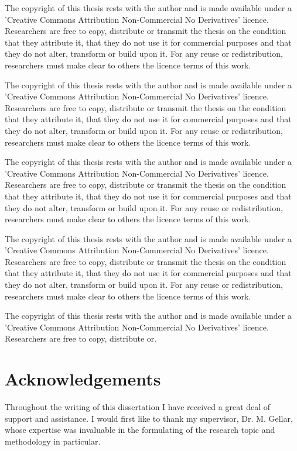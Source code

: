 \documentclass[a4paper,12pt]{report}
\begin{document}
The copyright of this thesis rests with the author and is made available under a 'Creative Commons Attribution Non-Commercial No Derivatives' licence. Researchers are free to copy, distribute or transmit the thesis on the condition that they attribute it, that they do not use it for commercial purposes and that they do not alter, transform or build upon it. For any reuse or redistribution, researchers must make clear to others the licence terms of this work.

The copyright of this thesis rests with the author and is made available under a 'Creative Commons Attribution Non-Commercial No Derivatives' licence. Researchers are free to copy, distribute or transmit the thesis on the condition that they attribute it, that they do not use it for commercial purposes and that they do not alter, transform or build upon it. For any reuse or redistribution, researchers must make clear to others the licence terms of this work.

The copyright of this thesis rests with the author and is made available under a 'Creative Commons Attribution Non-Commercial No Derivatives' licence. Researchers are free to copy, distribute or transmit the thesis on the condition that they attribute it, that they do not use it for commercial purposes and that they do not alter, transform or build upon it. For any reuse or redistribution, researchers must make clear to others the licence terms of this work.

The copyright of this thesis rests with the author and is made available under a 'Creative Commons Attribution Non-Commercial No Derivatives' licence. Researchers are free to copy, distribute or transmit the thesis on the condition that they attribute it, that they do not use it for commercial purposes and that they do not alter, transform or build upon it. For any reuse or redistribution, researchers must make clear to others the licence terms of this work.

The copyright of this thesis rests with the author and is made available under a 'Creative Commons Attribution Non-Commercial No Derivatives' licence. Researchers are free to copy, distribute or.


\chapter*{Acknowledgements}
Throughout the writing of this dissertation I have received a great deal of support and assistance. I  would  first  like  to  thank  my  supervisor,  Dr.  M.  Gellar,  whose  expertise  was  invaluable  in  the formulating of the research topic and methodology in particular.
\end{document}
